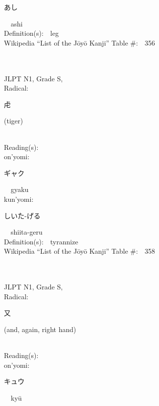 \begin{multicols}{2}
{\hspace*{2em}}{\begin{CJK}{UTF8}{min} あし \end{CJK}}\ \ ashi\ \ \\
Definition(s):\ \ leg \\
Wikipedia ``List of the J\=oy\=o Kanji'' Table \#:\ \ 356 \\
\ \ \\
{\fontsize{34pt}{40pt}  }\ \ \\
{JLPT N1, Grade S, \\Radical:\ \ {\begin{CJK}{UTF8}{min} 虍 \end{CJK}} (tiger) } \\
Reading(s):\ \ \\
{\hspace*{1em}}on'yomi:\ \ \\
{\hspace*{2em}}{\begin{CJK}{UTF8}{min} ギャク \end{CJK}}\ \ gyaku\ \ \\
{\hspace*{1em}}kun'yomi:\ \ \\
{\hspace*{2em}}{\begin{CJK}{UTF8}{min} しいた-げる \end{CJK}}\ \ shiita-geru\ \ \\
Definition(s):\ \ tyrannize \\
Wikipedia ``List of the J\=oy\=o Kanji'' Table \#:\ \ 358 \\
\ \ \\
{\fontsize{34pt}{40pt}  }\ \ \\
{JLPT N1, Grade S, \\Radical:\ \ {\begin{CJK}{UTF8}{min} 又 \end{CJK}} (and, again, right hand) } \\
Reading(s):\ \ \\
{\hspace*{1em}}on'yomi:\ \ \\
{\hspace*{2em}}{\begin{CJK}{UTF8}{min} キュウ \end{CJK}}\ \ ky\=u\ \ \\

\end{multicols}
